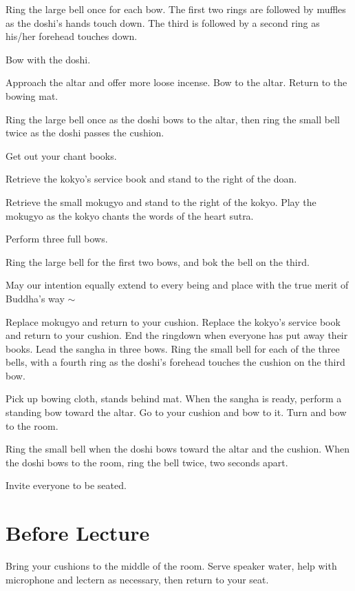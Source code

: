 \documentclass{chantbook}
\begin{document}
\begin{services}
\doan Ring the large bell once for each bow. The first two rings are followed
by muffles as the doshi's hands touch down. The third is followed by a second
ring as his/her forehead touches down.
\firstBows

\sangha Bow with the doshi.

\doshi Approach the altar and offer more loose incense. Bow to the altar.
Return to the bowing mat.

\doan Ring the large bell once as the doshi bows to the altar, then ring the
small bell twice as the doshi passes the cushion.
\takeOutChantBookBells

\sangha Get out your chant books.

\kokyo Retrieve the kokyo's service book and stand to the right of the doan.

\tenken Retrieve the small mokugyo and stand to the right of the kokyo. Play the
mokugyo as the kokyo chants the words of the heart sutra.

\doshi Perform three full bows.

\doan Ring the large bell for the first two bows, and bok the bell on the
third.
\secondBows

\kokyo \heartOfGreatPerfectWisdomSutra

\kokyo May our intention equally extend to every being and place with the true
merit of Buddha's way $\sim$ \largebell

\allBuddhas

\smallBellRolldown

\tenken Replace mokugyo and return to your cushion.
\kokyo Replace the kokyo's service book and return to your cushion.
\doan End the ringdown when everyone has put away their books.
\doshi Lead the sangha in three bows.
\doan Ring the small bell for each of the three bells, with a fourth ring as
the doshi's forehead touches the cushion on the third bow.
\lastBows

\doshi Pick up bowing cloth, stands behind mat. When the sangha is ready,
perform a standing bow toward the altar. Go to your cushion and bow to it. Turn
and bow to the room.

\doan Ring the small bell when the doshi bows toward the altar and the cushion.
When the doshi bows to the room, ring the bell twice, two seconds apart.
\beSeatedBells

\doshi Invite everyone to be seated.

\section*{Before Lecture}
\sangha Bring your cushions to the middle of the room.
\kokyo Serve speaker water, help with microphone and lectern as necessary,
then return to your seat.


\end{services}
\end{document}
